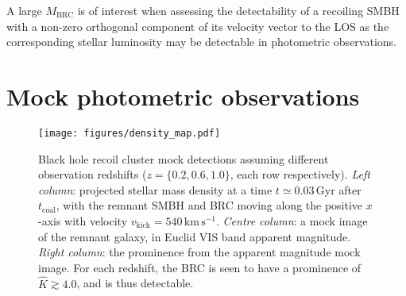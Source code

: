\documentclass[twocolumn]{aastex631}
\newcommand{\kmps}{\ensuremath{\mathrm{km}\,\mathrm{s}^{-1}} }%
\newcommand{\vk}{\ensuremath{v_\mathrm{kick}}}                %
\newcommand{\sigcore}{\ensuremath{\sigma_{\star,0}}}          %
\newcommand{\mbound}{\ensuremath{M_\mathrm{BRC}}}           %
\newcommand{\dd}[1]{\ensuremath{\mathrm{d}#1}}                %
\begin{document}
A large $\mbound$ is of interest when assessing the detectability of a recoiling SMBH with a non-zero orthogonal component of its velocity vector to the LOS \citep[e.g.][]{merritt2009,oleary2009} as the corresponding stellar luminosity may be detectable in photometric observations.

\section{Mock photometric observations}\label{sec:photo_obs}

\begin{figure*}
    \centering
    \texttt{[image: figures/density\_map.pdf]}
    \caption{
        Black hole recoil cluster mock detections assuming different observation redshifts ($z=\{0.2,0.6,1.0\}$, each row respectively).
        \textit{Left column}: projected stellar mass density at a time $t\simeq0.03\,\mathrm{Gyr}$ after $t_\mathrm{coal}$, with the remnant SMBH and BRC moving along the positive $x$-axis with velocity $\vk=540\,\kmps$.
        \textit{Centre column}: a mock image of the remnant galaxy, in Euclid VIS band apparent magnitude.
        \textit{Right column}: the prominence from the apparent magnitude mock image.
        For each redshift, the BRC is seen to have a prominence of $\hat{K}\gtrsim 4.0$, and is thus detectable.
    }
    \label{fig:projdens}
\end{figure*}
\end{document}
